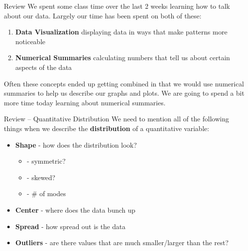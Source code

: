 \documentclass{beamer}
\begin{document}
\begin{frame}{Review}
We spent some class time over the last 2 weeks learning how to talk about our data. Largely our time has been spent on both of these:\vspace{4mm}

\begin{enumerate}
    \item \textbf{Data Visualization} displaying data in ways that make patterns more noticeable
    \item \textbf{Numerical Summaries} calculating numbers that tell us about certain aspects of the data
\end{enumerate}\vspace{4mm}

Often these concepts ended up getting combined in that we would use numerical summaries to help us describe our graphs and plots. We are going to spend a bit more time today learning about numerical summaries.
\end{frame}



\begin{frame}{Review -- Quantitative Distribution}
We need to mention all of the following things when we describe the \textbf{distribution} of a quantitative variable:\vspace{3mm}

\begin{itemize}%
 \item \textbf{Shape} - how does the distribution look?
    \begin{itemize}
        \item - symmetric?
        \item - skewed?
        \item - $\#$ of modes
    \end{itemize}
 \item \textbf{Center} - where does the data bunch up
 \item \textbf{Spread} - how spread out is the data
 \item \textbf{Outliers} - are there values that are much smaller/larger than the rest?
\end{itemize}
\end{frame}
\end{document}
